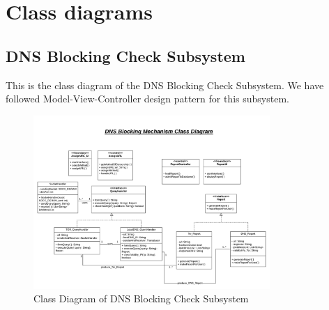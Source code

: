 \documentclass[12pt]{article}
\begin{document}
\newpage
\section{Class diagrams}

\subsection{DNS Blocking Check Subsystem}
This is the class diagram of the DNS Blocking Check Subsystem.
We have followed Model-View-Controller design pattern for this subsystem.
\begin{figure}[h]
    \centering
    \includegraphics[width=0.8\textwidth]{cddns.png}
    \caption{Class Diagram of DNS Blocking Check Subsystem}
    \label{fig:cddns}
\end{figure}

\newpage
\end{document}
